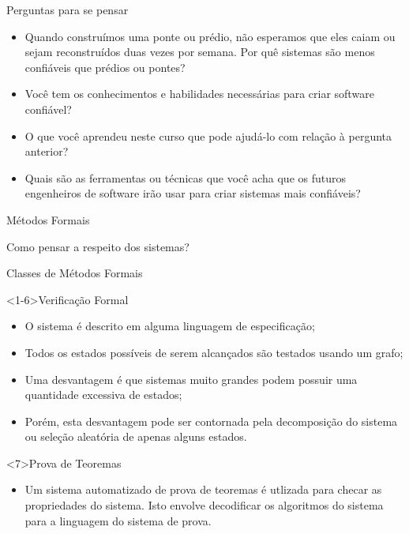 \begin{frame}{Perguntas para se pensar}

  \begin{itemize}
  \item<1-> Quando construímos uma ponte ou prédio, não esperamos que eles caiam ou sejam
    reconstruídos duas vezes por semana. Por quê sistemas são menos confiáveis que prédios
    ou pontes?
  \item<2-> Você tem os conhecimentos e habilidades necessárias para
    criar software confiável?
  \item<3-> O que você aprendeu neste curso que pode ajudá-lo com
    relação à pergunta anterior?
  \item<4-> Quais são as ferramentas ou técnicas que você acha que os futuros
    engenheiros de software irão usar para criar sistemas mais confiáveis?
  \end{itemize}
    
\end{frame}


\begin{frame}{Métodos Formais}

  \alert{Como pensar a respeito dos sistemas?}



  
\end{frame}

\begin{frame}{Classes de Métodos Formais}\footnotesize
  \begin{block}<1-6>{Verificação Formal}
    \begin{itemize}
    \item<2,6> O sistema é descrito em alguma linguagem de especificação;
    \item<3,6> Todos os estados possíveis de serem \alert{alcançados} são testados
      usando um grafo;
    \item<4,6> Uma \alert{desvantagem} é que sistemas muito grandes podem possuir uma
      quantidade excessiva de estados;
    \item<5,6> Porém, esta desvantagem pode ser contornada pela decomposição do sistema
      ou seleção aleatória de apenas alguns estados.
    \end{itemize}
    \end{block}

    \begin{block}<7>{Prova de Teoremas}
      \begin{itemize}
      \item Um sistema automatizado de prova de teoremas é utlizada para
        checar as propriedades do sistema. Isto envolve decodificar os algoritmos
        do sistema para a linguagem do sistema de prova.
      \end{itemize}
  \end{block}
  
\end{frame}


